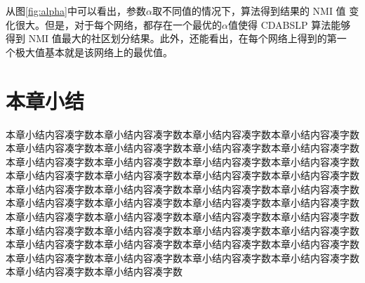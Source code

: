 从图\ref{fig:alpha}中可以看出，参数$\alpha$取不同值的情况下，算法得到结果的 NMI 值
变化很大。但是，对于每个网络，都存在一个最优的$\alpha$值使得 CDABSLP 算法能够
得到 NMI 值最大的社区划分结果。此外，还能看出，在每个网络上得到的第一
个极大值基本就是该网络上的最优值。



\section{本章小结}
本章小结内容凑字数本章小结内容凑字数本章小结内容凑字数本章小结内容凑字数本章小结内容凑字数本章小结内容凑字数本章小结内容凑字数本章小结内容凑字数本章小结内容凑字数本章小结内容凑字数本章小结内容凑字数本章小结内容凑字数本章小结内容凑字数本章小结内容凑字数本章小结内容凑字数本章小结内容凑字数本章小结内容凑字数本章小结内容凑字数本章小结内容凑字数本章小结内容凑字数本章小结内容凑字数本章小结内容凑字数本章小结内容凑字数本章小结内容凑字数本章小结内容凑字数本章小结内容凑字数本章小结内容凑字数本章小结内容凑字数本章小结内容凑字数本章小结内容凑字数本章小结内容凑字数本章小结内容凑字数本章小结内容凑字数本章小结内容凑字数本章小结内容凑字数本章小结内容凑字数本章小结内容凑字数本章小结内容凑字数本章小结内容凑字数本章小结内容凑字数本章小结内容凑字数本章小结内容凑字数



